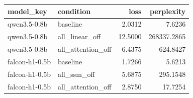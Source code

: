 \begin{tabular}{llrr}
\toprule
model_key & condition & loss & perplexity \\
\midrule
qwen3.5-0.8b & baseline & 2.0312 & 7.6236 \\
qwen3.5-0.8b & all_linear_off & 12.5000 & 268337.2865 \\
qwen3.5-0.8b & all_attention_off & 6.4375 & 624.8427 \\
falcon-h1-0.5b & baseline & 1.7266 & 5.6213 \\
falcon-h1-0.5b & all_ssm_off & 5.6875 & 295.1548 \\
falcon-h1-0.5b & all_attention_off & 2.8750 & 17.7254 \\
\bottomrule
\end{tabular}
